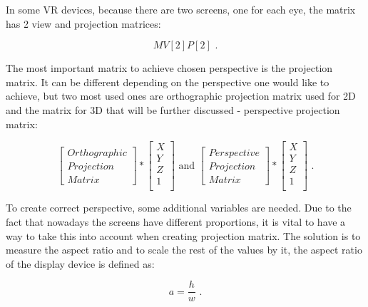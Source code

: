 In some VR devices, because there are two screens, one for each eye, the matrix has 2 view and projection matrices: 

\begin{equation}
MV[2]P[2]
\text{ .}
\label{mvp2equation}
\end{equation}

The most important matrix to achieve chosen perspective is the projection matrix. It can be different depending on the perspective one would like to achieve, but two most used ones are orthographic projection matrix used for 2D and the matrix for 3D that will be further discussed - perspective projection matrix:

\begin{equation}
\begin{bmatrix}
Orthographic\\
Projection \\
Matrix
\end{bmatrix} 
*
\begin{bmatrix}
X\\
Y\\
Z\\
1\\
\end{bmatrix} 
\text{ and }
\begin{bmatrix}
Perspective\\
Projection \\
Matrix
\end{bmatrix} 
*
\begin{bmatrix}
X\\
Y\\
Z\\
1\\
\end{bmatrix}
\text{ .}
\label{projectionmatrices}
\end{equation}

To create correct perspective, some additional variables are needed. Due to the fact that nowadays the screens have different proportions, it is vital to have a way to take this into account when creating projection matrix. The solution is to measure the aspect ratio and to scale the rest of the values by it, the aspect ratio of the display device is defined as:

\begin{equation}
a=\frac{h}{w}
\text{ .}
\label{aequation}
\end{equation}

